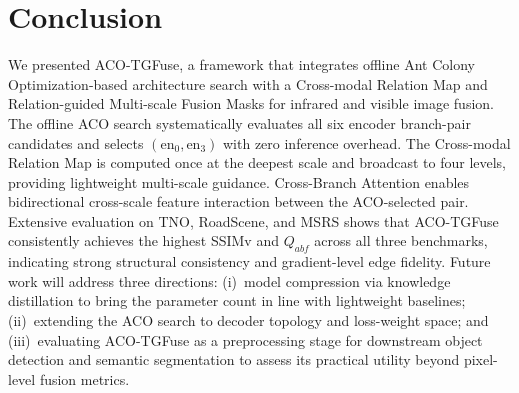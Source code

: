 \documentclass[a4paper,fleqn]{cas-dc}
\begin{document}
\FloatBarrier
\section{Conclusion}
\label{sec:conclusion}

We presented ACO-TGFuse, a framework that integrates offline Ant Colony
Optimization-based architecture search with a Cross-modal Relation Map and
Relation-guided Multi-scale Fusion Masks for infrared and visible image
fusion.  The offline ACO search systematically evaluates all six encoder
branch-pair candidates and selects $(\mathrm{en}_0,\mathrm{en}_3)$ with
zero inference overhead.  The Cross-modal Relation Map is computed once at
the deepest scale and broadcast to four levels, providing lightweight
multi-scale guidance.  Cross-Branch Attention enables bidirectional
cross-scale feature interaction between the ACO-selected pair.
Extensive evaluation on TNO, RoadScene, and MSRS shows that ACO-TGFuse
consistently achieves the highest SSIMv and $Q_{abf}$ across all three
benchmarks, indicating strong structural consistency and gradient-level
edge fidelity.
Future work will address three directions: (i)~model compression via
knowledge distillation to bring the parameter count in line with
lightweight baselines; (ii)~extending the ACO search to decoder topology
and loss-weight space; and (iii)~evaluating ACO-TGFuse as a preprocessing
stage for downstream object detection and semantic segmentation to
assess its practical utility beyond pixel-level fusion metrics.



\end{document}
